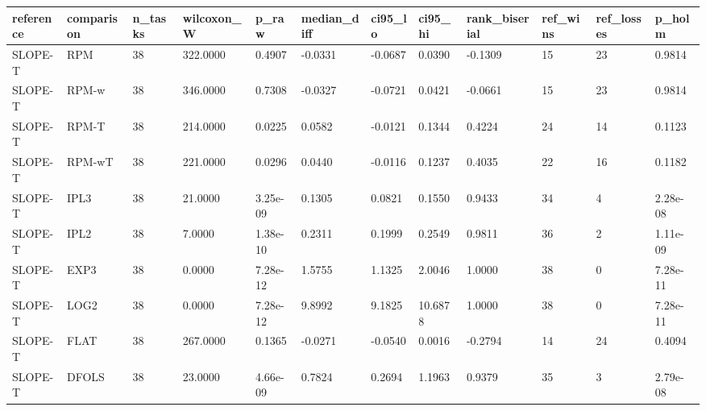 \begin{tabular}{llllllllllll}
\hline
reference & comparison & n\_tasks & wilcoxon\_W & p\_raw & median\_diff & ci95\_lo & ci95\_hi & rank\_biserial & ref\_wins & ref\_losses & p\_holm \\
\hline
SLOPE-T & RPM & 38 & 322.0000 & 0.4907 & -0.0331 & -0.0687 & 0.0390 & -0.1309 & 15 & 23 & 0.9814 \\
SLOPE-T & RPM-w & 38 & 346.0000 & 0.7308 & -0.0327 & -0.0721 & 0.0421 & -0.0661 & 15 & 23 & 0.9814 \\
SLOPE-T & RPM-T & 38 & 214.0000 & 0.0225 & 0.0582 & -0.0121 & 0.1344 & 0.4224 & 24 & 14 & 0.1123 \\
SLOPE-T & RPM-wT & 38 & 221.0000 & 0.0296 & 0.0440 & -0.0116 & 0.1237 & 0.4035 & 22 & 16 & 0.1182 \\
SLOPE-T & IPL3 & 38 & 21.0000 & 3.25e-09 & 0.1305 & 0.0821 & 0.1550 & 0.9433 & 34 & 4 & 2.28e-08 \\
SLOPE-T & IPL2 & 38 & 7.0000 & 1.38e-10 & 0.2311 & 0.1999 & 0.2549 & 0.9811 & 36 & 2 & 1.11e-09 \\
SLOPE-T & EXP3 & 38 & 0.0000 & 7.28e-12 & 1.5755 & 1.1325 & 2.0046 & 1.0000 & 38 & 0 & 7.28e-11 \\
SLOPE-T & LOG2 & 38 & 0.0000 & 7.28e-12 & 9.8992 & 9.1825 & 10.6878 & 1.0000 & 38 & 0 & 7.28e-11 \\
SLOPE-T & FLAT & 38 & 267.0000 & 0.1365 & -0.0271 & -0.0540 & 0.0016 & -0.2794 & 14 & 24 & 0.4094 \\
SLOPE-T & DFOLS & 38 & 23.0000 & 4.66e-09 & 0.7824 & 0.2694 & 1.1963 & 0.9379 & 35 & 3 & 2.79e-08 \\
\hline
\end{tabular}
